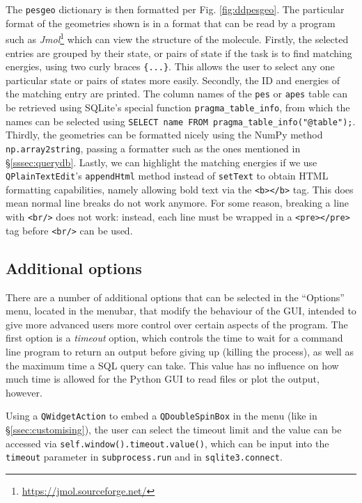 \documentclass[12pt]{article}
\begin{document}
The \texttt{pesgeo} dictionary is then formatted per Fig. \ref{fig:ddpesgeo}. The particular format of the geometries shown is in a format that can be read by a program such as \textit{Jmol}\footnote{\url{https://jmol.sourceforge.net/}} which can view the structure of the molecule. Firstly, the selected entries are grouped by their state, or pairs of state if the task is to find matching energies, using two curly braces \texttt{\{...\}}. This allows the user to select any one particular state or pairs of states more easily. Secondly, the ID and energies of the matching entry are printed. The column names of the \texttt{pes} or \texttt{apes} table can be retrieved using SQLite's special function \texttt{pragma\_table\_info}, from which the names can be selected using \texttt{SELECT name FROM pragma_table_info("@table");}. Thirdly, the geometries can be formatted nicely using the NumPy method \texttt{np.array2string}, passing a formatter such as the ones mentioned in \S\ref{sssec:querydb}. Lastly, we can highlight the matching energies if we use \texttt{QPlainTextEdit}'s \texttt{appendHtml} method instead of \texttt{setText} to obtain HTML formatting capabilities, namely allowing bold text via the \texttt{<b></b>} tag. This does mean normal line breaks do not work anymore. For some reason, breaking a line with \texttt{<br/>} does not work: instead, each line must be wrapped in a \texttt{<pre></pre>} tag before \texttt{<br/>} can be used.

\subsection{Additional options}\label{ssec:additional_options}

There are a number of additional options that can be selected in the ``Options'' menu, located in the menubar, that modify the behaviour of the GUI, intended to give more advanced users more control over certain aspects of the program. The first option is a \textit{timeout} option, which controls the time to wait for a command line program to return an output before giving up (killing the process), as well as the maximum time a SQL query can take. This value has no influence on how much time is allowed for the Python GUI to read files or plot the output, however.

Using a \texttt{QWidgetAction} to embed a \texttt{QDoubleSpinBox} in the menu (like in \S\ref{ssec:customising}), the user can select the timeout limit and the value can be accessed via \texttt{self.window().timeout.value()}, which can be input into the \texttt{timeout} parameter in \texttt{subprocess.run} and in \texttt{sqlite3.connect}.
\end{document}

